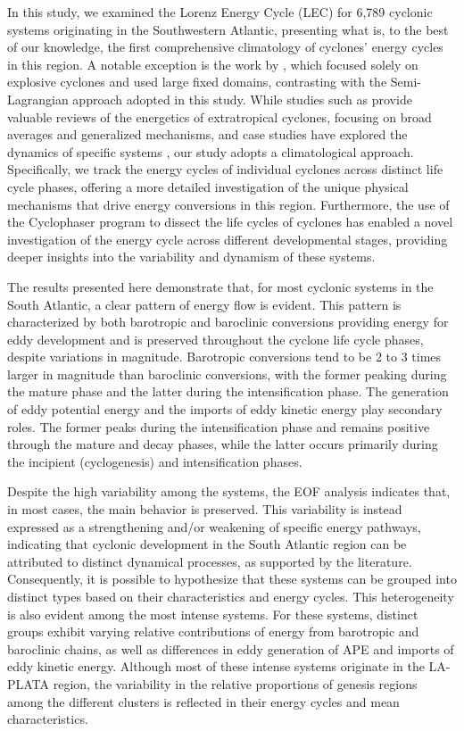 \documentclass[pdflatex,sn-chicago]{sn-jnl}%
\theoremstyle{plain}
\theoremstyle{definition}
\theoremstyle{remark}
\theoremstyle{definition}
\begin{document}
In this study, we examined the Lorenz Energy Cycle (LEC) for 6,789 cyclonic systems originating in the Southwestern Atlantic, presenting what is, to the best of our knowledge, the first comprehensive climatology of cyclones' energy cycles in this region. A notable exception is the work by \citet{black2013universal}, which focused solely on explosive cyclones and used large fixed domains, contrasting with the Semi-Lagrangian approach adopted in this study. While studies such as \citet{smith1980energetics} provide valuable reviews of the energetics of extratropical cyclones, focusing on broad averages and generalized mechanisms, and case studies have explored the dynamics of specific systems \citep[e.g.]{pezza2014large,dias2011energy,cavicchia2018energetics}, our study adopts a climatological approach. Specifically, we track the energy cycles of individual cyclones across distinct life cycle phases, offering a more detailed investigation of the unique physical mechanisms that drive energy conversions in this region. Furthermore, the use of the Cyclophaser program to dissect the life cycles of cyclones has enabled a novel investigation of the energy cycle across different developmental stages, providing deeper insights into the variability and dynamism of these systems.

The results presented here demonstrate that, for most cyclonic systems in the South Atlantic, a clear pattern of energy flow is evident. This pattern is characterized by both barotropic and baroclinic conversions providing energy for eddy development and is preserved throughout the cyclone life cycle phases, despite variations in magnitude. Barotropic conversions tend to be 2 to 3 times larger in magnitude than baroclinic conversions, with the former peaking during the mature phase and the latter during the intensification phase. The generation of eddy potential energy and the imports of eddy kinetic energy play secondary roles. The former peaks during the intensification phase and remains positive through the mature and decay phases, while the latter occurs primarily during the incipient (cyclogenesis) and intensification phases.

Despite the high variability among the systems, the EOF analysis indicates that, in most cases, the main behavior is preserved. This variability is instead expressed as a strengthening and/or weakening of specific energy pathways, indicating that cyclonic development in the South Atlantic region can be attributed to distinct dynamical processes, as supported by the literature. Consequently, it is possible to hypothesize that these systems can be grouped into distinct types based on their characteristics and energy cycles. This heterogeneity is also evident among the most intense systems. For these systems, distinct groups exhibit varying relative contributions of energy from barotropic and baroclinic chains, as well as differences in eddy generation of APE and imports of eddy kinetic energy. Although most of these intense systems originate in the LA-PLATA region, the variability in the relative proportions of genesis regions among the different clusters is reflected in their energy cycles and mean characteristics.
\end{document}
